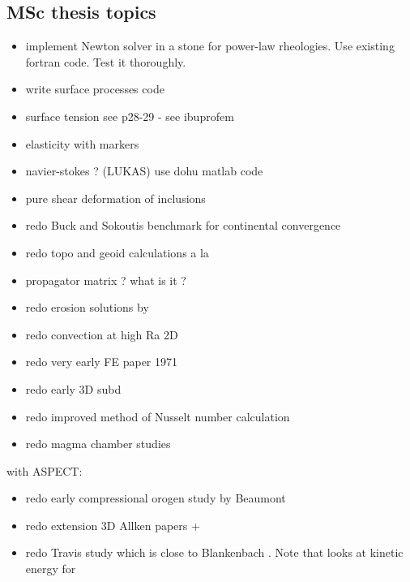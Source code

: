 \subsection{MSc thesis topics}
\begin{itemize} 
\item implement Newton solver in a stone for power-law rheologies. Use existing fortran code. Test it thoroughly.
\item write surface processes code
\item surface tension see \cite{reddybook2}p28-29 - see ibuprofem 
\item elasticity with markers
\item navier-stokes ? (LUKAS) use dohu matlab code
\item pure shear deformation of inclusions \cite{trla00}
\item redo Buck and Sokoutis benchmark for continental convergence \cite{buso94}
\item redo topo and geoid calculations a la \cite{king09}
\item propagator matrix ? what is it ? \cite{ribe18} 
\Literature \cite{haoc78,haoc81,riha84,zhon96,como97,mohc98,zhzu00,lezh08,leha08,mofm07,mibb09,fope91,lizh13,bugo94} 
\item redo erosion solutions by \cite{cull60} 
\item redo convection at high Ra 2D \cite{scan85}
\item redo very early FE paper 1971 \cite{stbe71}
\item redo early 3D subd \cite{zhgu96}
\item redo improved method of Nusselt number calculation \cite{hohr87}
\item redo magma chamber studies \cite{cuwi14,gehn18}
\end{itemize}

with ASPECT:

\begin{itemize}
\item redo early compressional orogen study by Beaumont \cite{bequ94}
\item redo extension 3D Allken papers + \cite{poay84,katl95} 
\item redo Travis study \cite{trab90} which is close to Blankenbach \cite{blbc89}. Note that \cite{maie12} looks at kinetic energy for \cite{trab90} 
\end{itemize}




